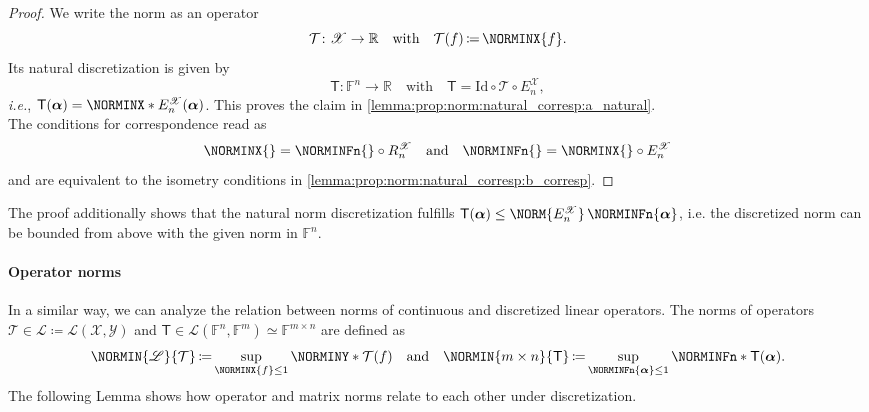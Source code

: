 \documentclass[a4paper]{paper}
\newcommand*{\SPC}[1]{{\ensuremath{\mathscr{#1}}}}
\newcommand*{\SPCL}{\SPC{L}}
\newcommand*{\SPCX}{\SPC{X}}
\newcommand*{\SPCY}{\SPC{Y}}
\newcommand*{\BLINOP}[2]{{\SPCL(#1, #2)}}
\newcommand{\FIELD}{{\ensuremath{\mathbb{F}}}}
\newcommand*{\Fn}{{\ensuremath{\FIELD^n}}}
\newcommand*{\Fm}{{\ensuremath{\FIELD^m}}}
\newcommand*{\Fmxn}{{\ensuremath{\FIELD^{m \times n}}}}
\newcommand{\RR}{{\ensuremath{\mathbb{R}}}}
\newcommand*{\OP}[1]{{\ensuremath{\mathcal{#1}}}}
\newcommand*{\OPT}{\OP{T}}
\newcommand*{\OPID}{\OP{\mathrm{Id}}}
\newcommand{\DISCOP}[1]{{\ensuremath{\mathsf{#1}}}}
\newcommand*{\DISCOPT}{\DISCOP{T}}
\newcommand*{\EXT}[2]{\ensuremath{E_{#1}^{#2}}}
\newcommand*{\REST}[2]{\ensuremath{R_{#1}^{#2}}}
\newcommand*{\RnX}{{\ensuremath{\REST{n}{\SPC{X}}}}}
\newcommand*{\EnX}{{\ensuremath{\EXT{n}{\SPC{X}}}}}
\DeclareMathOperator{\DEFEQ}{{\coloneqq}}
\newcommand{\ie}{\textsl{i.e.}\xspace}
\newcommand{\valpha}{\boldsymbol{\alpha}}
\begin{document}
\begin{proof}
 We write the norm as an operator
 \begin{equation*}
  \OPT \colon \SPCX \to \RR \quad \text{with} \quad \OPT(f) \DEFEQ  \NORMINX{f}.
 \end{equation*}
 Its natural discretization is given by
 \begin{equation*}
  \DISCOPT \colon \Fn \to \RR \quad \text{with} \quad \DISCOPT = \OPID \circ \OPT \circ \EnX,
 \end{equation*}
 \ie, $\DISCOPT(\valpha) = \NORMINX*{\EnX(\valpha)}$. This proves the claim in 
 \eqref{lemma:prop:norm:natural_corresp:a_natural}.\\
 The conditions for correspondence read as
 \begin{equation*}
  \NORMINX{} = \NORMINFn{} \circ \RnX
  \quad \text{and} \quad
  \NORMINFn{} = \NORMINX{} \circ \EnX
 \end{equation*}
 and are equivalent to the isometry conditions in \eqref{lemma:prop:norm:natural_corresp:b_corresp}.
\end{proof}

\begin{remark}
 The proof additionally shows that the natural norm discretization fulfills
 $\DISCOPT(\valpha) \leq \NORM{\EnX}\, \NORMINFn{\valpha}$, i.e. the discretized norm can be bounded from above 
 with the given norm in $\Fn$.
\end{remark}


\paragraph{Operator norms}

In a similar way, we can analyze the relation between norms of continuous and discretized linear operators. 
The norms of operators $\OPT \in \SPCL \DEFEQ  \BLINOP{\SPCX}{\SPCY}$ and 
$\DISCOPT \in \SPCL(\Fn, \Fm) \simeq \Fmxn$ are defined as
%
\begin{equation*}
 \NORMIN{\SPCL}{\OPT} \DEFEQ  \sup_{\NORMINX{f} \leq 1} \NORMINY*{\OPT(f)}
 \quad \text{and} \quad
 \NORMIN{m\times n}{\DISCOPT} \DEFEQ  \sup_{\NORMINFn{\valpha} \leq 1} \NORMINFn*{\DISCOPT(\valpha)}.
\end{equation*}
%
The following Lemma shows how operator and matrix norms relate to each other under discretization.
\end{document}
